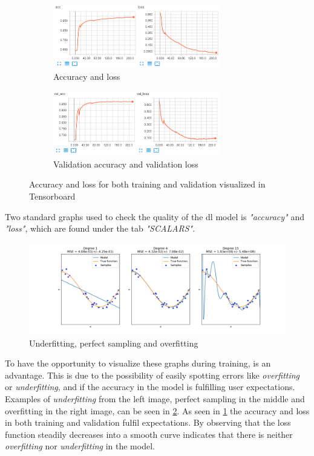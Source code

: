 \documentclass[USenglish]{ifimaster}  %
\begin{document}
\begin{figure}[H]
\centering
\begin{subfigure}[b]{\textwidth}
\centering
\includegraphics[width=0.8\textwidth]{bilder/tensorboard_acc.png}
\caption{Accuracy and loss}
\end{subfigure}
\hfill
\begin{subfigure}[b]{\textwidth}
\centering
\includegraphics[width=0.8\textwidth]{bilder/tensorboard_val_acc.png}
\caption{Validation accuracy and validation loss}
\end{subfigure}
\caption{Accuracy and loss for both training and validation visualized in Tensorboard}
\label{fig:accuracy_loss}
\end{figure}
Two standard graphs used to check the quality of the \ac{dl} model is \textit{"accuracy"} and \textit{"loss"}, which are found under the tab \textit{"SCALARS"}. 
\begin{figure}[H]
    \centering
    \includegraphics[width=1\textwidth]{bilder/overfitting_underfitting.png}
    \caption{Underfitting, perfect sampling and overfitting \cite{website:overfitting_underfitting}}
    \label{fig:overfitting_underfitting}
\end{figure}
To have the opportunity to visualize these graphs during training, is an advantage. This is due to the possibility of easily spotting errors like \textit{overfitting} or \textit{underfitting}, and if the accuracy in the model is fulfilling user expectations. Examples of \textit{underfitting} from the left image, perfect sampling in the middle and overfitting in the right image, can be seen in \cref{fig:overfitting_underfitting}. As seen in \cref{fig:accuracy_loss} the accuracy and loss in both training and validation fulfil expectations. 
By observing that the loss function steadily decreases into a smooth curve indicates that there is neither \textit{overfitting} nor \textit{underfitting} in the model.
\end{document}
